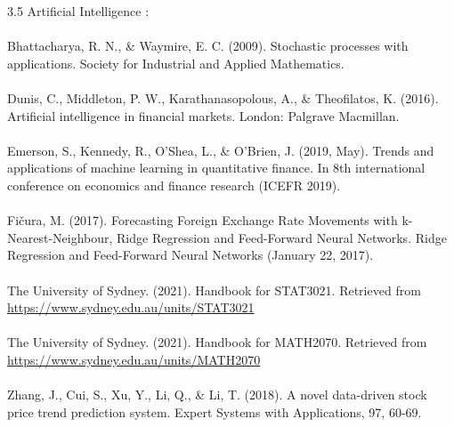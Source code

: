 \documentclass{article}
\begin{document}
    3.5 Artificial Intelligence :\\
	\\
	Bhattacharya, R. N., & Waymire, E. C. (2009). Stochastic processes with applications. Society for Industrial and Applied Mathematics.\\
	\\
	Dunis, C., Middleton, P. W., Karathanasopolous, A., & Theofilatos, K. (2016). Artificial intelligence in financial markets. London: Palgrave Macmillan.\\
	\\
	Emerson, S., Kennedy, R., O'Shea, L., & O'Brien, J. (2019, May). Trends and applications of machine learning in quantitative finance. In 8th international conference on economics and finance research (ICEFR 2019).\\
	\\
	Fičura, M. (2017). Forecasting Foreign Exchange Rate Movements with k-Nearest-Neighbour, Ridge Regression and Feed-Forward Neural Networks. Ridge Regression and Feed-Forward Neural Networks (January 22, 2017).\\
	\\
	The University of Sydney. (2021). Handbook for STAT3021. Retrieved from\\ \url{https://www.sydney.edu.au/units/STAT3021}\\
	\\
	The University of Sydney. (2021). Handbook for MATH2070. Retrieved from\\ \url{https://www.sydney.edu.au/units/MATH2070}\\
	\\
	Zhang, J., Cui, S., Xu, Y., Li, Q., & Li, T. (2018). A novel data-driven stock price trend prediction system. Expert Systems with Applications, 97, 60-69.\\
	\\
	
\end{document}

